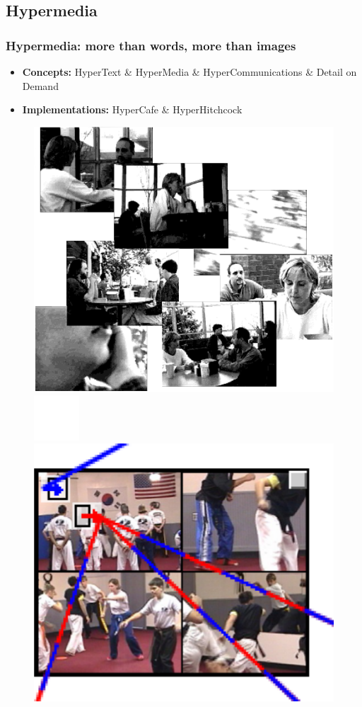 \documentclass[compress]{beamer}
\begin{document}
	\subsection{Hypermedia}
  		\begin{frame}[c]
		\frametitle{Hypermedia: more than words, more than images}
		\begin{itemize}
		\item \textbf{Concepts:} HyperText \& HyperMedia \& HyperCommunications \& Detail on  Demand
		\vfill
		\item \textbf{Implementations:} HyperCafe \& HyperHitchcock  %
				
		\end{itemize}
		
		\begin{figure}
			\includegraphics[height=0.4\textheight]{figures/hypercafe.png}
			\includegraphics[height=0.1\textheight]{figures/space.png}
			\includegraphics[height=0.4\textheight]{figures/hitchcock.png}

\end{figure}
\end{frame}
\end{document}

